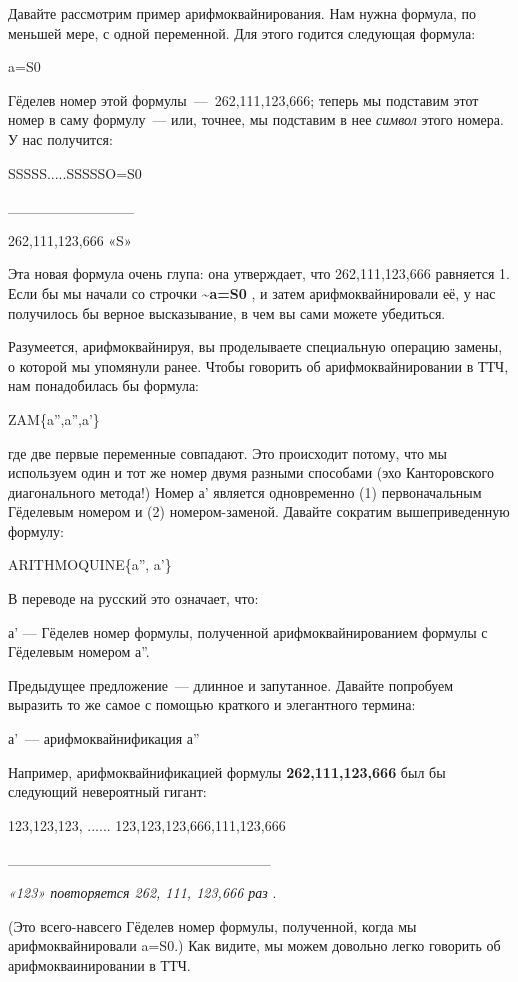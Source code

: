 \documentclass[../main.tex]{subfiles}
\begin{document}
Давайте рассмотрим пример арифмоквайнирования. Нам нужна формула, по меньшей мере, с одной переменной. Для этого годится следующая формула:

a=S0

Гёделев номер этой формулы~---~262,111,123,666; теперь мы подставим этот номер в саму формулу~--- или, точнее, мы подставим в нее \emph{символ} этого номера. У нас получится:

SSSSS.....SSSSSO=S0

\textbar\_\_\_\_\_\_\_\_\_\_\_\_\textbar{}

262,111,123,666 «S»

Эта новая формула очень глупа: она утверждает, что 262,111,123,666 равняется 1. Если бы мы начали со строчки \textbf{\textasciitilde a=S0} , и затем арифмоквайнировали её, у нас получилось бы верное высказывание, в чем вы сами можете убедиться.

Разумеется, арифмоквайнируя, вы проделываете специальную операцию замены, о которой мы упомянули ранее. Чтобы говорить об арифмоквайнировании в ТТЧ, нам понадобилась бы формула:

ZAM\{a'',a'',a'\}

где две первые переменные совпадают. Это происходит потому, что мы используем один и тот же номер двумя разными способами (эхо Канторовского диагонального метода!) Номер а' является одновременно (1) первоначальным Гёделевым номером и (2) номером-заменой. Давайте сократим вышеприведенную формулу:

ARITHMOQUINE\{a'', a'\}

В переводе на русский это означает, что:

а' --- Гёделев номер формулы, полученной арифмоквайнированием формулы с Гёделевым номером а''.

Предыдущее предложение~--- длинное и запутанное. Давайте попробуем выразить то же самое с помощью краткого и элегантного термина:

а'~--- арифмоквайнификация а''

Например, арифмоквайнификацией формулы \textbf{262,111,123,666} был бы следующий невероятный гигант:

123,123,123, ...... 123,123,123,666,111,123,666

\textbar\_\_\_\_\_\_\_\_\_\_\_\_\_\_\_\_\_\_\_\_\_\_\_\_\_\textbar{}

\emph{«123» повторяется 262, 111, 123,666 раз} .

(Это всего-навсего Гёделев номер формулы, полученной, когда мы арифмоквайнировали a=S0.) Как видите, мы можем довольно легко говорить об арифмокваинировании в ТТЧ.
\end{document}
